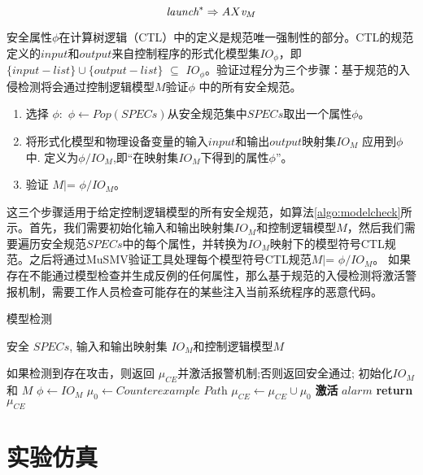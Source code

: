 \[\raggedright
\textit{launch}^{*}\Rightarrow AX \textit{v}_{M}
\]

安全属性\textit {$ \phi {} $}在计算树逻辑（CTL）中的定义是规范唯一强制性的部分。CTL的规范定义的$ input $和$ output $来自控制程序的形式化模型集$ IO_\phi $，即$ \{input-list\} \cup{}  \{output-list\}$
$\subseteq{}$ \textit{$IO_\phi$}。验证过程分为三个步骤：基于规范的入侵检测将会通过控制逻辑模型$ M $验证\textit{$\phi{}$ }中的所有安全规范。
\begin{enumerate}
	\item 选择 $\phi$:~$\phi \leftarrow Pop(SPECs)$从安全规范集中$SPECs$取出一个属性$\phi$。
	\item 将形式化模型和物理设备变量的输入$input$和输出$output$映射集$IO_{M}$ 应用到$\phi$中. 定义为$\phi/IO_M$,即“在映射集$IO_M$下得到的属性$\phi$”。
	\item 验证 $M \vert{}$= \textit{$\phi/IO_M$}。
\end{enumerate}

这三个步骤适用于给定控制逻辑模型的所有安全规范，如算法\ref{algo:modelcheck}所示。首先，我们需要初始化输入和输出映射集$ IO_M $和控制逻辑模型$ M $，然后我们需要遍历安全规范$ SPECs $中的每个属性，并转换为$ IO_M $映射下的模型符号CTL规范。之后将通过MuSMV验证工具处理每个模型符号CTL规范$M \vert{}$= \textit{$\phi/IO_M$}。 如果存在不能通过模型检查并生成反例的任何属性，那么基于规范的入侵检测将激活警报机制，需要工作人员检查可能存在的某些注入当前系统程序的恶意代码。

\begin{algorithm}[h]
\caption{模型检测}
\label{algo:modelcheck}
\begin{algorithmic}[1]
\Require %
安全 $SPECs$, 输入和输出映射集 $IO_M$和控制逻辑模型$M$ 

\Ensure %
如果检测到存在攻击，则返回 $\mu_{CE}$并激活报警机制;否则返回安全通过; 
\State 初始化$IO_M$ 和 $M$
\State $\phi \leftarrow IO_M$
\State $\mu_0 \leftarrow \textit{Counterexample Path}$
\State $\mu_{CE} \leftarrow \mu_{CE}\cup \mu_0$
\EndIf
\EndFor
{}
\State \textbf{激活} $alarm$
\EndIf
\State \textbf{return} $\mu_{CE}$

\end{algorithmic}
\end{algorithm}	

\section{实验仿真}
\label{sec:insertimage}

